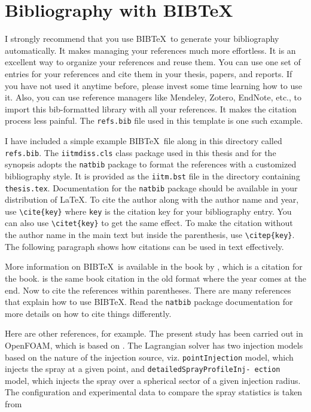 \section{Bibliography with BIB\TeX}

I strongly recommend that you use BIB\TeX\ to generate your bibliography automatically.  It makes managing your references much more effortless.  It is an excellent way to organize your references and reuse them.  You can use one set of entries for your references and cite them in your thesis, papers, and reports.  If you have not used it anytime before, please invest some time learning how to use it. Also, you can use reference
managers like Mendeley, Zotero, EndNote, etc., to import this bib-formatted library with all your references. It makes the citation process less painful. The \verb+refs.bib+ file used in this template is one such example.

I have included a simple example BIB\TeX\ file along in this directory called \verb+refs.bib+.  The \verb+iitmdiss.cls+ class package used in this thesis and for the synopsis adopts the \verb+natbib+ package to format the references with a customized bibliography style. It is provided as the \verb+iitm.bst+ file in the directory containing \verb+thesis.tex+.  Documentation for the \verb+natbib+ package should be available in your distribution of \LaTeX.  To cite the author along with the author name and year, use \verb+\cite{key}+ where \verb+key+ is the citation key for your bibliography entry.  You can also use \verb+\citet{key}+ to get the same effect.  To make the citation without the author name in the main text but inside the parenthesis, use \verb+\citep{key}+.  The following paragraph shows how citations can be used in text effectively.

More information on BIB\TeX\ is available in the book by \cite{lamport:86}, which is a citation for the book. \cite{lamport1:86} is the same book citation in the old format where the year comes at the end. Now to cite the references within parentheses. There are many references~\citep{lamport:86} that explain how to use BIB\TeX.  Read the \verb+natbib+ package documentation for more details on how to cite things differently.

Here are other references, for example.  The present study has been carried out in OpenFOAM, which is based on \cite{Weller1998}. The Lagrangian solver has two injection models based on the nature of the injection source, viz. \texttt{pointInjection} model, which injects the spray at a given point, and \texttt{detailedSprayProfileInj- ection} model, which injects the spray over a spherical sector of a given injection radius. The configuration and experimental data to compare the spray statistics is taken from \cite{Zhou2015a}

